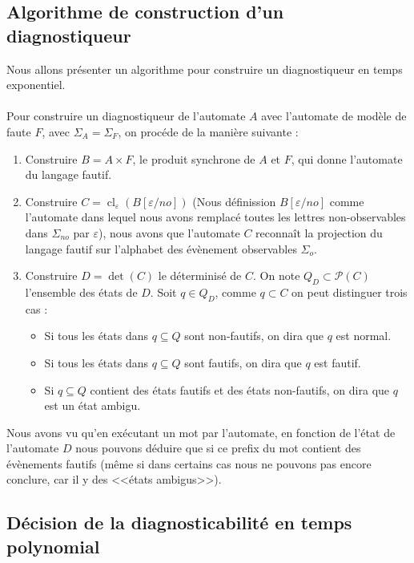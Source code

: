 \documentclass[10pt,a4paper]{article}
\begin{document}
\subsection{Algorithme de construction d'un diagnostiqueur}
    Nous allons présenter un algorithme pour construire un diagnostiqueur en temps exponentiel. ~\cite{SamSRST96}

    \paragraph{}
    Pour construire un diagnostiqueur de l'automate $A$ avec l'automate de mod\`ele de faute $F$, avec $\Sigma_A = \Sigma_F$, on proc\'ede de la mani\`ere suivante :
    
\begin{enumerate}
  \item Construire $B=A\times F$, le produit synchrone de $A$ et $F$, qui donne l'automate du langage fautif.
  \item Construire $C=\operatorname{cl}_\varepsilon(B[\varepsilon/no])$ (Nous d\'efinission $B[\varepsilon/no]$ comme l'automate dans lequel nous avons remplac\'e toutes les lettres non-observables dans $\Sigma_{no}$ par $\varepsilon$), nous avons que l'automate $C$ reconna\^it la projection du langage fautif sur l'alphabet des \'ev\`enement observables $\Sigma_o$.
  \item Construire $D=\det(C)$ le d\'eterminis\'e de $C$. On note $Q_D \subset \mathcal{P}(C)$ l'ensemble des états de $D$. Soit $q \in Q_D$, comme $q \subset C$ on peut distinguer trois cas :
  \begin{itemize}
    \item Si tous les \'etats dans $q\subseteq Q$ sont non-fautifs, on dira que $q$ est normal.
    \item Si tous les \'etats dans $q\subseteq Q$ sont fautifs, on dira que $q$ est fautif.
    \item Si $q\subseteq Q$ contient des \'etats fautifs et des \'etats non-fautifs, on dira que $q$ est un \'etat ambigu.
  \end{itemize}
\end{enumerate} 

Nous avons vu qu'en ex\'ecutant un mot par l'automate, en fonction de l'\'etat de l'automate $D$ nous pouvons d\'eduire que si ce prefix du mot contient des \'ev\`enements fautifs (m\^eme si dans certains cas nous ne pouvons pas encore conclure, car il y des <<\'etats ambigus>>). 

\subsection{D\'ecision de la diagnosticabilit\'e en temps polynomial}
\end{document}
